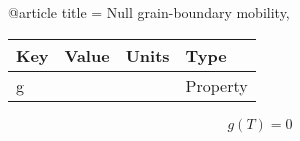@article{
title = {Null grain-boundary mobility},
}

\begin{tabular}{|l|l|l|l|}
    \hline
    Key & Value & Units & Type \\
    \hline
    g &   &  & Property\\
    \hline
\end{tabular}

\begin{equation}
g(T)=0
\end{equation}

